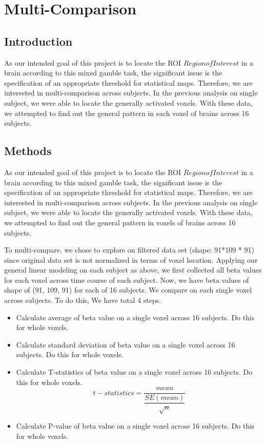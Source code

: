 \section{Multi-Comparison}

\subsection{Introduction}
As our intended goal of this project is to locate the ROI \(Region of Interest\) in a brain according to this mixed gamble task, the significant issue is the specification of an appropriate threshold for statistical maps. Therefore, we are interested in multi-comparison across subjects. In the previous analysis on single subject, we were able to locate the generally activated voxels. With these data, we attempted to find out the general pattern in each voxel of brains across 16 subjects. 

\subsection{Methods}
As our intended goal of this project is to locate the ROI \(Region of Interest\) in a brain according to this mixed gamble task, the significant issue is the specification of an appropriate threshold for statistical maps. Therefore, we are interested in multi-comparison across subjects. In the previous analysis on single subject, we were able to locate the generally activated voxels. With these data, we attempted to find out the general pattern in voxels of brains across 16 subjects. 

To multi-compare, we chose to explore on filtered data set (shape: 91*109 * 91) since original data set is not normalized in terms of voxel location. Applying our general linear modeling on each subject as above, we first collected all beta values for each voxel across time course of each subject. Now, we have beta values of shape of (91, 109, 91) for each of 16 subjects. We compare on each single voxel across subjects. To do this, We have total 4 steps.

\begin{itemize}
\item Calculate average of beta value on a single voxel across 16 subjects. Do this for whole voxels.\\
\item Calculate standard deviation of beta value on a single voxel across 16 subjects. Do this for whole voxels. \\
\item Calculate T-statistics of beta value on a single voxel across 16 subjects. Do this for whole voxels.\\
\[ 
  t-statistics = \dfrac{mean}{\dfrac{SE(mean)}{\sqrt{n}}}
\]

\item Calculate P-value of beta value on a single voxel across 16 subjects. Do this for whole voxels. \\
\end{itemize}

